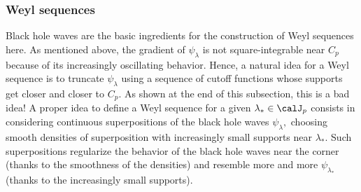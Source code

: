 \subsubsection{Weyl sequences}
Black hole waves are the basic ingredients for the construction of Weyl sequences here. As mentioned above, the gradient of $\psi_\lambda$ is not square-integrable near $C_p$ because of its increasingly oscillating behavior. Hence, a natural idea for a Weyl sequence is to truncate $\psi_\lambda$ using a sequence of cutoff functions whose supports get closer and closer to $C_p.$ As shown at the end of this subsection, this is a bad idea! A proper idea to define a Weyl sequence for a given $\lambda_* \in \calJ_p$ consists in considering continuous superpositions of the black hole waves $\psi_\lambda,$ choosing smooth densities of superposition with increasingly small supports near $\lambda_*.$ Such superpositions regularize the behavior of the black hole waves near the corner (thanks to the smoothness of the densities) and resemble more and more $\psi_{\lambda_*}$ (thanks to the increasingly small supports).

